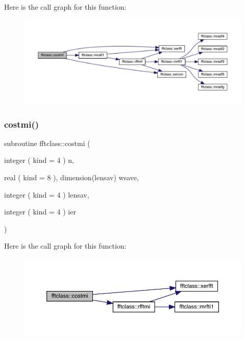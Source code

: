 Here is the call graph for this function\+:\nopagebreak
\begin{figure}[H]
\begin{center}
\leavevmode
\includegraphics[width=350pt]{namespacefftclass_a04e4666f4382e42cf8e63ee5c44fc61a_cgraph}
\end{center}
\end{figure}
\mbox{\label{namespacefftclass_a4e2ea9d14ac7ed425be8cb1fd1ed8ddf}} 
\subsubsection{\texorpdfstring{costmi()}{costmi()}}
{\footnotesize\ttfamily subroutine fftclass\+::costmi (\begin{DoxyParamCaption}\item[{integer ( kind = 4 )}]{n,  }\item[{real ( kind = 8 ), dimension(lensav)}]{wsave,  }\item[{integer ( kind = 4 )}]{lensav,  }\item[{integer ( kind = 4 )}]{ier }\end{DoxyParamCaption})}

Here is the call graph for this function\+:\nopagebreak
\begin{figure}[H]
\begin{center}
\leavevmode
\includegraphics[width=350pt]{namespacefftclass_a4e2ea9d14ac7ed425be8cb1fd1ed8ddf_cgraph}
\end{center}
\end{figure}
\mbox{\label{namespacefftclass_acef38aed3ece8d2c1120ce0004e6297e}} 
